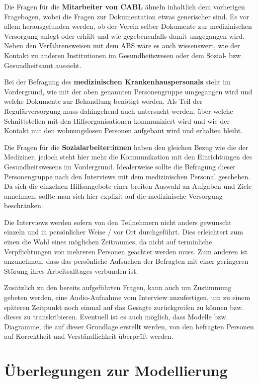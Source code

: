 Die Fragen für die \textbf{Mitarbeiter von CABL} ähneln inhaltlich dem vorherigen Fragebogen, wobei die Fragen zur Dokumentation etwas generischer sind. Es vor allem herausgefunden werden, ob der Verein selber Dokumente zur medizinischen Versorgung anlegt oder erhält und wie gegebenenfalls damit umgegangen wird. Neben den Verfahrensweisen mit dem ABS wäre es auch wissenswert, wie der Kontakt zu anderen Institutionen im Gesundheitswesen oder dem Sozial- bzw. Gesundheitsamt aussieht.

Bei der Befragung des \textbf{medizinischen Krankenhauspersonals} steht im Vordergrund, wie mit der oben genannten Personengruppe umgegangen wird und welche Dokumente zur Behandlung benötigt werden. Als Teil der Regulärversorgung muss dahingehend auch untersucht werden, über welche Schnittstellen mit den Hilfsorganisationen kommuniziert wird und wie der Kontakt mit den wohnungslosen Personen aufgebaut wird und erhalten bleibt.

Die Fragen für die \textbf{Sozialarbeiter:innen} haben den gleichen Bezug wie die der Mediziner, jedoch steht hier mehr die Kommunikation mit den Einrichtungen des Gesundheitswesens im Vordergrund. Idealerweise sollte die Befragung dieser Personengruppe nach den Interviews mit dem medizinischen Personal geschehen. Da sich die einzelnen Hilfsangebote einer breiten Auswahl an Aufgaben und Ziele annehmen, sollte man sich hier explizit auf die medizinische Versorgung beschränken.

Die Interviews werden sofern von den Teilnehmern nicht anders gewünscht einzeln und in persönlicher Weise / vor Ort durchgeführt. Dies erleichtert zum einen die Wahl eines möglichen Zeitraumes, da nicht auf terminliche Verpflichtungen von mehreren Personen geachtet werden muss. Zum anderen ist anzunehmen, dass das persönliche Aufsuchen der Befragten mit einer geringeren Störung ihres Arbeitsalltages verbunden ist.

Zusätzlich zu den bereits aufgeführten Fragen, kann auch um Zustimmung gebeten werden, eine Audio-Aufnahme vom Interview anzufertigen, um zu einem späteren Zeitpunkt noch einmal auf das Gesagte zurückgreifen zu können bzw. dieses zu transkribieren. Eventuell ist es auch möglich, dass Modelle bzw. Diagramme, die auf dieser Grundlage erstellt werden, von den befragten Personen auf Korrektheit und Verständlichkeit überprüft werden.


\section{Überlegungen zur Modellierung}\label{sec:model}

